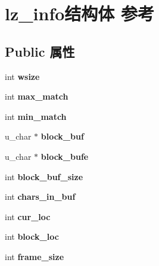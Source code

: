 \hypertarget{structlz__info}{}\section{lz\+\_\+info结构体 参考}
\label{structlz__info}
\subsection*{Public 属性}
\begin{DoxyCompactItemize}
\item 
\mbox{\label{structlz__info_a6668fd5d28cfa9ea640e843d999e4578}} 
int {\bfseries wsize}
\item 
\mbox{\label{structlz__info_aa82fc76f0256f7b7f1e719d59958c733}} 
int {\bfseries max\+\_\+match}
\item 
\mbox{\label{structlz__info_a35d735e98393751f8c52771f4730cb3f}} 
int {\bfseries min\+\_\+match}
\item 
\mbox{\label{structlz__info_a5637d4443ed301526621eb26063979b3}} 
u\+\_\+char $\ast$ {\bfseries block\+\_\+buf}
\item 
\mbox{\label{structlz__info_ab383eba848de8aa14769e8038e08c59f}} 
u\+\_\+char $\ast$ {\bfseries block\+\_\+bufe}
\item 
\mbox{\label{structlz__info_ad6cfe9e122eca4a0ab6283bbcae35935}} 
int {\bfseries block\+\_\+buf\+\_\+size}
\item 
\mbox{\label{structlz__info_a289f727736d5b2c13e36ff5a615f7e0f}} 
int {\bfseries chars\+\_\+in\+\_\+buf}
\item 
\mbox{\label{structlz__info_a23ebf2da395f742b5ada9fb6e1e232b2}} 
int {\bfseries cur\+\_\+loc}
\item 
\mbox{\label{structlz__info_ad58fbfda3ef2f319711be6bded5b0fea}} 
int {\bfseries block\+\_\+loc}
\item 
\mbox{\label{structlz__info_a0d360c3434b83bc6f871f00e4c8ce337}} 
int {\bfseries frame\+\_\+size}

\end{DoxyCompactItemize}
